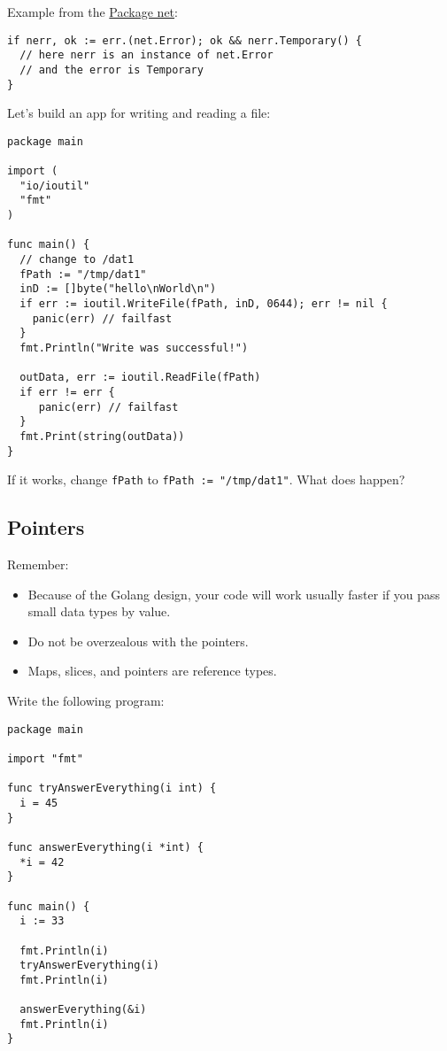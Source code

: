 \documentclass[11pt, letterpaper]{article}
\begin{document}
Example from the \href{https://golang.org/src/net/net.go}{Package net}:

\begin{verbatim}
if nerr, ok := err.(net.Error); ok && nerr.Temporary() {
  // here nerr is an instance of net.Error
  // and the error is Temporary
}
\end{verbatim}

Let's build an app for writing and reading a file:

\begin{verbatim}
package main

import (
  "io/ioutil"
  "fmt"
)

func main() {
  // change to /dat1
  fPath := "/tmp/dat1"
  inD := []byte("hello\nWorld\n")
  if err := ioutil.WriteFile(fPath, inD, 0644); err != nil {
    panic(err) // failfast
  }
  fmt.Println("Write was successful!")

  outData, err := ioutil.ReadFile(fPath)
  if err != err {
     panic(err) // failfast
  }
  fmt.Print(string(outData))
}
\end{verbatim}

If it works, change \texttt{fPath} to \texttt{fPath := "/tmp/dat1"}. What does happen?

\subsection{Pointers}

Remember:

\begin{itemize}
\item Because of the Golang design, your code will work usually faster if you pass small data types by value.
\item Do not be overzealous with the pointers.
\item Maps, slices, and pointers are reference types.
\end{itemize}

Write the following program:

\begin{verbatim}
package main

import "fmt"

func tryAnswerEverything(i int) {
  i = 45
}

func answerEverything(i *int) {
  *i = 42
}

func main() {
  i := 33

  fmt.Println(i)
  tryAnswerEverything(i)
  fmt.Println(i)

  answerEverything(&i)
  fmt.Println(i)
}
\end{verbatim}
\end{document}
